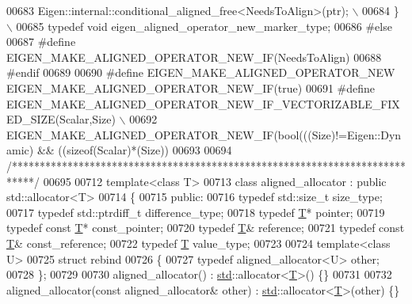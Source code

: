 \begin{DoxyCode}
00683 \textcolor{preprocessor}{        Eigen::internal::conditional\_aligned\_free<NeedsToAlign>(ptr); \(\backslash\)}
00684 \textcolor{preprocessor}{      \} \(\backslash\)}
00685 \textcolor{preprocessor}{      typedef void eigen\_aligned\_operator\_new\_marker\_type;}
00686 \textcolor{preprocessor}{#else}
00687 \textcolor{preprocessor}{  #define EIGEN\_MAKE\_ALIGNED\_OPERATOR\_NEW\_IF(NeedsToAlign)}
00688 \textcolor{preprocessor}{#endif}
00689 
00690 \textcolor{preprocessor}{#define EIGEN\_MAKE\_ALIGNED\_OPERATOR\_NEW EIGEN\_MAKE\_ALIGNED\_OPERATOR\_NEW\_IF(true)}
00691 \textcolor{preprocessor}{#define EIGEN\_MAKE\_ALIGNED\_OPERATOR\_NEW\_IF\_VECTORIZABLE\_FIXED\_SIZE(Scalar,Size) \(\backslash\)}
00692 \textcolor{preprocessor}{  EIGEN\_MAKE\_ALIGNED\_OPERATOR\_NEW\_IF(bool(((Size)!=Eigen::Dynamic) &&
       ((sizeof(Scalar)*(Size))%
00693 
00694 \textcolor{comment}{/****************************************************************************/}
00695 
00712 \textcolor{keyword}{template}<\textcolor{keyword}{class} T>
00713 \textcolor{keyword}{class }aligned\_allocator : \textcolor{keyword}{public} std::allocator<T>
00714 \{
00715 \textcolor{keyword}{public}:
00716   \textcolor{keyword}{typedef} std::size\_t     size\_type;
00717   \textcolor{keyword}{typedef} std::ptrdiff\_t  difference\_type;
00718   \textcolor{keyword}{typedef} \hyperlink{group___sparse_core___module_class_eigen_1_1_triplet}{T}*              pointer;
00719   \textcolor{keyword}{typedef} \textcolor{keyword}{const} \hyperlink{group___sparse_core___module_class_eigen_1_1_triplet}{T}*        const\_pointer;
00720   \textcolor{keyword}{typedef} \hyperlink{group___sparse_core___module_class_eigen_1_1_triplet}{T}&              reference;
00721   \textcolor{keyword}{typedef} \textcolor{keyword}{const} \hyperlink{group___sparse_core___module_class_eigen_1_1_triplet}{T}&        const\_reference;
00722   \textcolor{keyword}{typedef} \hyperlink{group___sparse_core___module_class_eigen_1_1_triplet}{T}               value\_type;
00723 
00724   \textcolor{keyword}{template}<\textcolor{keyword}{class} U>
00725   \textcolor{keyword}{struct }rebind
00726   \{
00727     \textcolor{keyword}{typedef} aligned\_allocator<U> other;
00728   \};
00729 
00730   aligned\_allocator() : \hyperlink{namespacestd}{std}::allocator<\hyperlink{group___sparse_core___module_class_eigen_1_1_triplet}{T}>() \{\}
00731 
00732   aligned\_allocator(\textcolor{keyword}{const} aligned\_allocator& other) : \hyperlink{namespacestd}{std}::allocator<\hyperlink{group___sparse_core___module_class_eigen_1_1_triplet}{T}>(other) \{\}
}
\end{DoxyCode}
